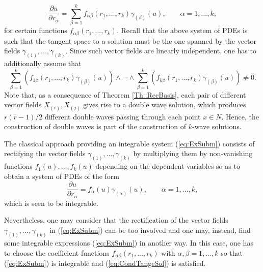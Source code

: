 \documentclass[12pt]{article}
\theoremstyle{plain}
\theoremstyle{definition}
\numberwithin{equation}{section}
\begin{document}
\begin{equation}\label{eq:ExSubm}
\frac{\partial u}{\partial r_\alpha}=\sum_{\beta=1}^kf_{\alpha\beta}(r_1,\ldots,r_k)\gamma_{(\beta)}(u),\qquad \alpha=1,\ldots,k,
\end{equation}
for certain functions $f_{\alpha\beta}(r_1,\ldots,r_k)$. Recall that the above system of PDEs is such that the tangent space to a solution must be the one spanned by the vector fields $\gamma_{(1)},\ldots,\gamma_{(k)}.$ Since such vector fields are linearly independent, one has to additionally assume that
\begin{equation}\label{eq:CondTangeSol}
\sum_{\beta=1}^k(f_{1\beta}(r_1,\ldots,r_k)\gamma_{(\beta)}(u))\wedge \cdots\wedge\sum_{\beta=1}^k( f_{k\beta}(r_1,\ldots,r_k)\gamma_{(\beta)}(u))\neq 0.
\end{equation}
Note that, as a consequence of Theorem \ref{Th::RecBasis}, each pair of different vector fields $X_{(i)},X_{(j)}$ gives rise to a double wave solution, which produces $r(r-1)/2$ different double waves passing through each point $x\in N$. Hence, the construction of double waves is part of the construction of $k$-wave solutions. 

The classical approach providing an integrable system (\ref{eq:ExSubm}) consists of rectifying the vector fields $\gamma_{(1)},\ldots,\gamma_{(k)}$ by multiplying them by non-vanishing functions $f_1(u),\ldots,f_k(u)$ depending on the dependent variables so as to obtain a system of PDEs of the form
$$
\frac{\partial u}{\partial r_\alpha}=f_\alpha(u)\gamma_{(\alpha)}(u),\qquad \alpha=1,\ldots,k,
$$
which is seen to be integrable. 

Nevertheless, one may consider that the rectification of the vector fields $\gamma_{(1)},\ldots,\gamma_{(k)}$ in (\ref{eq:ExSubm}) can be too involved and one may, instead, find some integrable expressions (\ref{eq:ExSubm}) in another way. In this case, one has to choose the coefficient functions $f_{\alpha\beta}(r_1,\ldots,r_k)$ with $\alpha,\beta=1,\ldots,k$ so that (\ref{eq:ExSubm}) is integrable and (\ref{eq:CondTangeSol}) is satisfied.
\end{document}
